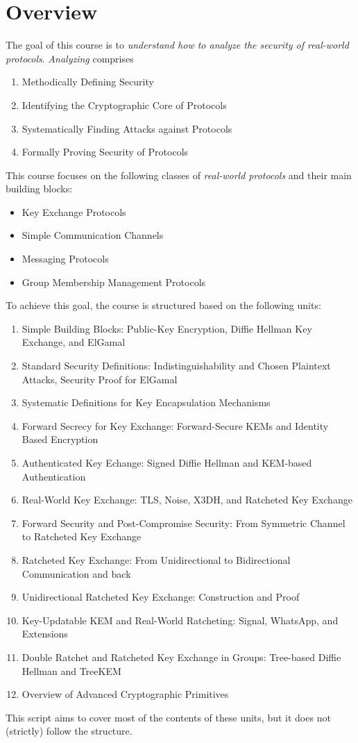 \section{Overview}
\label{sec:overview}

The goal of this course is to \emph{understand how to analyze the security of real-world protocols}.
\emph{Analyzing} comprises
%
\begin{enumerate}
    \item Methodically Defining Security
    \item Identifying the Cryptographic Core of Protocols
    \item Systematically Finding Attacks against Protocols
    \item Formally Proving Security of Protocols
\end{enumerate}
%
This course focuses on the following classes of \emph{real-world protocols} and their main building blocks:
%
\begin{itemize}
    \item Key Exchange Protocols
    \item Simple Communication Channels
    \item Messaging Protocols
    \item Group Membership Management Protocols
\end{itemize}
%
To achieve this goal, the course is structured based on the following units:
%
\begin{enumerate}
    \item Simple Building Blocks: Public-Key Encryption, Diffie Hellman Key Exchange, and ElGamal
    \item Standard Security Definitions: Indistinguishability and Chosen Plaintext Attacks, Security Proof for ElGamal
    \item Systematic Definitions for Key Encapsulation Mechanisms
    \item Forward Secrecy for Key Exchange: Forward-Secure KEMs and Identity Based Encryption
    \item Authenticated Key Echange: Signed Diffie Hellman and KEM-based Authentication
    \item Real-World Key Exchange: TLS, Noise, X3DH, and Ratcheted Key Exchange
    \item Forward Security and Post-Compromise Security: From Symmetric Channel to Ratcheted Key Exchange
    \item Ratcheted Key Exchange: From Unidirectional to Bidirectional Communication and back
    \item Unidirectional Ratcheted Key Exchange: Construction and Proof
    \item Key-Updatable KEM and Real-World Ratcheting: Signal, WhatsApp, and Extensions
    \item Double Ratchet and Ratcheted Key Exchange in Groups: Tree-based Diffie Hellman and TreeKEM
    \item Overview of Advanced Cryptographic Primitives
\end{enumerate}
%
This script aims to cover most of the contents of these units, but it does not (strictly) follow the structure.

